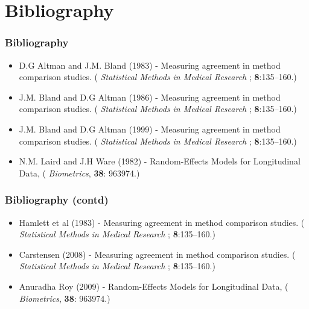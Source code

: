
\section{Bibliography}
\begin{frame}\frametitle{Bibliography}
\begin{itemize}
\item D.G Altman and J.M. Bland (1983) - Measuring agreement in method comparison studies. ( \textit{Statistical Methods in Medical Research} ; \textbf{8}:135--160.)
\item J.M. Bland  and D.G Altman  (1986) - Measuring agreement in method comparison studies. ( \textit{Statistical Methods in Medical Research} ; \textbf{8}:135--160.)
\item J.M. Bland  and D.G Altman  (1999) - Measuring agreement in method comparison studies. ( \textit{Statistical Methods in Medical Research} ; \textbf{8}:135--160.)
\item N.M. Laird and J.H Ware (1982) - Random-Effects Models for Longitudinal Data, ( \textit{Biometrics}, \textbf{38}: 963974.)
\end{itemize}
\end{frame}
\begin{frame}\frametitle{Bibliography (contd)}
\begin{itemize}
\item Hamlett et al (1983) - Measuring agreement in method comparison studies. ( \textit{Statistical Methods in Medical Research} ; \textbf{8}:135--160.)
\item Carstensen   (2008) - Measuring agreement in method comparison studies. ( \textit{Statistical Methods in Medical Research} ; \textbf{8}:135--160.)
\item Anuradha Roy (2009) - Random-Effects Models for Longitudinal Data, ( \textit{Biometrics}, \textbf{38}: 963974.)
\end{itemize}
\end{frame}













